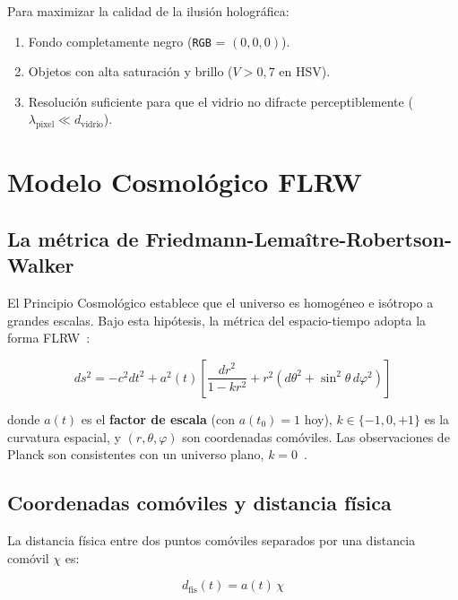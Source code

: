 \documentclass[12pt, a4paper]{article}
\begin{document}
Para maximizar la calidad de la ilusión holográfica:

\begin{enumerate}
  \item Fondo completamente negro (\texttt{RGB} = $(0,0,0)$).
  \item Objetos con alta saturación y brillo ($V > 0{,}7$ en HSV).
  \item Resolución suficiente para que el vidrio no difracte
        perceptiblemente ($\lambda_{\text{pixel}} \ll d_{\text{vidrio}}$).
\end{enumerate}

\section{Modelo Cosmológico FLRW}

\subsection{La métrica de Friedmann-Lemaître-Robertson-Walker}

El Principio Cosmológico establece que el universo es homogéneo e
isótropo a grandes escalas. Bajo esta hipótesis, la métrica del
espacio-tiempo adopta la forma FLRW~\cite{ryden2017}:

\begin{equation}
  ds^2 = -c^2 dt^2 + a^2(t)\left[
    \frac{dr^2}{1-kr^2} + r^2\left(d\theta^2 + \sin^2\theta\, d\varphi^2\right)
  \right]
  \label{eq:flrw}
\end{equation}

donde $a(t)$ es el \textbf{factor de escala} (con $a(t_0)=1$ hoy),
$k \in \{-1,0,+1\}$ es la curvatura espacial, y $(r,\theta,\varphi)$
son coordenadas comóviles. Las observaciones de Planck son
consistentes con un universo plano, $k=0$~\cite{planck2018}.

\subsection{Coordenadas comóviles y distancia física}

La distancia física entre dos puntos comóviles separados por una
distancia comóvil $\chi$ es:

\begin{equation}
  d_{\text{fis}}(t) = a(t)\, \chi
  \label{eq:pos_fisica}
\end{equation}
\end{document}
